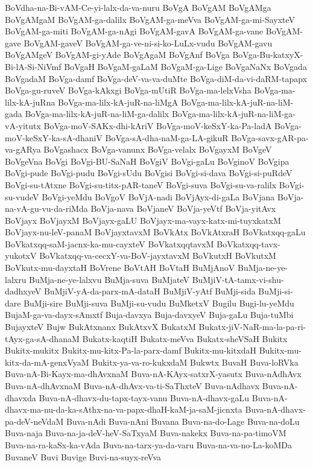 {BoVdha-na-Bi-vAM-Ce-yi-lalx-da-va-nuru
BoVgA
BoVgAM
BoVgAMga
BoVgAMgaM
BoVgAM-ga-dalilx
BoVgAM-ga-meVva
BoVgAM-ga-mi-SayxteV
BoVgAM-ga-miti
BoVgAM-ga-nAgi
BoVgAM-gavA
BoVgAM-ga-vane
BoVgAM-gave
BoVgAM-gaveV
BoVgAM-ga-ve-ni-si-ko-LuLx-vudu
BoVgAM-gavu
BoVgAMgeV
BoVgAM-gi-yAde
BoVgAgaM
BoVgAnf
BoVga
BoVga-Bu-katxyX-Bi-lA-Si-NiVmf
BoVgaH
BoVgaM-gaLaM
BoVgaM-ga-Lige
BoVgaNaNx
BoVgada
BoVgadaM
BoVga-damf
BoVga-deV-va-va-duMte
BoVga-diM-da-vi-daRM-tapapx
BoVga-gu-ruveV
BoVga-kAkxgi
BoVga-mUtiR
BoVga-ma-lelxVsha
BoVga-ma-lilx-kA-juRna
BoVga-ma-lilx-kA-juR-na-liMgA
BoVga-ma-lilx-kA-juR-na-liM-gada
BoVga-ma-lilx-kA-juR-na-liM-ga-dalilx
BoVga-ma-lilx-kA-juR-na-liM-ga-vA-yitutx
BoVga-moV-SAKx-dhi-kAriV
BoVga-moV-keSxY-ka-Pa-ladA
BoVga-moV-keSxY-ka-sA-dhaniV
BoVga-sA-dha-naM-ga-LA-gikuR
BoVga-savx-gAR-pa-va-gARya
BoVgashacx
BoVga-vanunx
BoVga-velalx
BoVgayxM
BoVgeV
BoVgeVna
BoVgi
BoVgi-BU-SaNaH
BoVgiV
BoVgi-gaLu
BoVginoV
BoVgipa
BoVgi-pude
BoVgi-pudu
BoVgi-sUdu
BoVgisi
BoVgi-si-dava
BoVgi-si-puRdeV
BoVgi-su-tAtxne
BoVgi-su-titx-pAR-taneV
BoVgi-suva
BoVgi-su-va-ralilx
BoVgi-su-vudeV
BoVgi-yeMdu
BoVgoV
BoVjA-nadi
BoVjAyx-di-gaLa
BoVjana
BoVja-na-vA-gu-vu-da-riMda
BoVja-nava
BoVjaneV
BoVja-yeVtf
BoVja-yitAvx
BoVjayx
BoVjayxM
BoVjayx-gaLU
BoVjayx-ma-vayx-katx-mi-tuyxkatxM
BoVjayx-nu-leV-panaM
BoVjayxtavxM
BoVkAtx
BoVkAtxraH
BoVkatxqq-gaLu
BoVkatxqq-saM-jacnx-ka-mu-cayxteV
BoVkatxqqtavxM
BoVkatxqq-tavx-yukotxV
BoVkatxqq-va-cecxY-va-BoV-jayxtavxM
BoVkutxH
BoVkutxM
BoVkutx-mu-dayxtaH
BoVrene
BoVtAH
BoVtaH
BuMjAnoV
BuMja-ne-ye-lalxru
BuMja-ne-ye-lalxvu
BuMja-suva
BuMjateV
BuMjiV-tA-tamx-vi-shu-dadhxyeV
BuMjiV-yA-da-parx-mA-dataH
BuMjiV-yAtf
BuMji-sida
BuMji-si-dare
BuMji-sire
BuMji-suva
BuMji-su-vudu
BuMketxV
Bugilu
Bugi-lu-yeMdu
BujaM-ga-va-dayx-sAmxtf
Buja-davxya
Buja-davxyeV
Buja-gaLu
Buja-tuMbi
BujayxteV
Bujw
BukAtxnanx
BukAtxvX
BukatxM
Bukatx-jiV-NaR-ma-la-pa-ri-tAyx-ga-sA-dhanaM
Bukatx-kaqtiH
Bukatx-meVva
Bukatx-sheVSaH
Bukitx
Bukitx-mukitx
Bukitx-mu-kitx-Pa-la-parx-damf
Bukitx-mu-kitxdaH
Bukitx-mu-kitx-da-mA-genxVyaM
Bukitx-ya-va-ro-kukxdaM
Bukwtx
BuvaH
Buva-loRVka
Buva-nA-Bi-Kayx-ma-dhAvxnaM
Buva-nA-KAyx-satxrX-yasutx
Buva-nAdhAvx
Buva-nA-dhAvxnaM
Buva-nA-dhAvx-va-ti-SaThxteV
Buva-nAdhavx
Buva-nA-dhavxda
Buva-nA-dhavx-du-tapx-tayx-vanu
Buva-nA-dhavx-gaLu
Buva-nA-dhavx-ma-nu-da-ka-sAthx-na-va-papx-dhaH-kaM-ja-saM-jicnxta
Buva-nA-dhavx-pa-deV-neVdaM
Buva-nAdi
Buva-nAni
Buvana
Buva-na-do-Lage
Buva-na-doLu
Buva-naja
Buva-na-ja-deV-heV-SaTxyaM
Buva-nakekx
Buva-na-pa-timoVM
Buva-na-ra-kaSx-ka-vAda
Buva-na-tarx-ya-da-varu
Buva-na-va-no-La-koMDa
BuvaneV
Buvi
Buvige
Buvi-na-suyx-reVva
}
